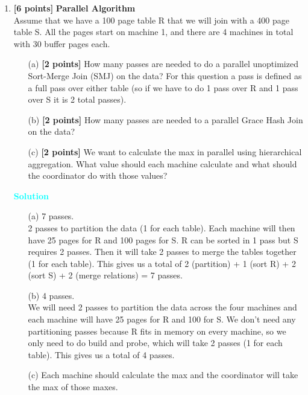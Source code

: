 \documentclass[10pt]{article}
\newenvironment{solution}
    { \begin{mdframed}[backgroundcolor=gray!10] \textcolor{cyan}{\textbf{Solution}} \\}
    {  \end{mdframed}}
\begin{document}
\begin{enumerate}
	\item \textbf{[6 points]} \textbf{Parallel Algorithm} \\
	      Assume that we have a 100 page table R that we will join with a 400 page table S.
	      All the pages start on machine 1, and there are 4 machines in total with 30 buffer pages each.
	      \begin{itemize}
		      \item[(a)] \textbf{[2 points]} How many passes are needed to do a parallel unoptimized Sort-Merge Join (SMJ) on the data? For
		            this question a pass is defined as a full pass over either table (so if we have to do 1 pass over R and 1 pass
		            over S it is 2 total passes).
		      \item[(b)] \textbf{[2 points]} How many passes are needed to a parallel Grace Hash Join on the data?
		      \item[(c)] \textbf{[2 points]} We want to calculate the max in parallel using hierarchical aggregation. What value should
		            each machine calculate and what should the coordinator do with those values?
	      \end{itemize}
	      \begin{solution}
		      \begin{itemize}
			      \item[(a)] 7 passes.\\
			            2 passes to partition the data (1 for each table). Each machine will then have 25 pages for R
			            and 100 pages for S. R can be sorted in 1 pass but S requires 2 passes. Then it will take 2 passes
			            to merge the tables together (1 for each table). This gives us a total of 2 (partition) + 1 (sort R)
			            + 2 (sort S) + 2 (merge relations) = 7 passes.
			      \item[(b)] 4 passes. \\
			            We will need 2 passes to partition the data across the four machines and each machine
			            will have 25 pages for R and 100 for S. We don't need any partitioning passes because R fits in
			            memory on every machine, so we only need to do build and probe, which will take 2 passes (1 for
			            each table). This gives us a total of 4 passes.
			      \item[(c)] Each machine should calculate the max and the coordinator will take the max of those maxes.
		      \end{itemize}
	      \end{solution}

\end{enumerate}
\end{document}
